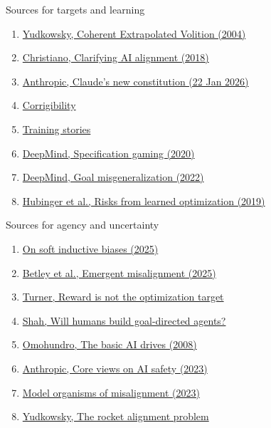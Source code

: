 \documentclass[aspectratio=169,11pt]{beamer}
\begin{document}
\begin{frame}[t,label=refstarget]{Sources for targets and learning}
\footnotesize\begin{enumerate}\setlength{\itemsep}{2mm}
\item \href{https://intelligence.org/files/CEV.pdf}{Yudkowsky, Coherent Extrapolated Volition (2004)}
\item \href{https://ai-alignment.com/clarifying-ai-alignment-cec47cd69dd6}{Christiano, Clarifying AI alignment (2018)}
\item \href{https://www.anthropic.com/news/claude-new-constitution}{Anthropic, Claude's new constitution (22 Jan 2026)}
\item \href{https://www.lesswrong.com/w/corrigibility-1}{Corrigibility}
\item \href{https://www.alignmentforum.org/posts/FDJnZt8Ks2djouQTZ/how-do-we-become-confident-in-the-safety-of-a-machine}{Training stories}
\item \href{https://deepmind.google/blog/specification-gaming-the-flip-side-of-ai-ingenuity/}{DeepMind, Specification gaming (2020)}
\item \href{https://deepmind.google/blog/how-undesired-goals-can-arise-with-correct-rewards/}{DeepMind, Goal misgeneralization (2022)}
\item \href{https://arxiv.org/abs/1906.01820}{Hubinger et al., Risks from learned optimization (2019)}
\end{enumerate}
\end{frame}

\begin{frame}[t,label=refsagency]{Sources for agency and uncertainty}
\footnotesize\begin{enumerate}\setlength{\itemsep}{2mm}
\item \href{https://arxiv.org/abs/2503.02113}{On soft inductive biases (2025)}
\item \href{https://arxiv.org/abs/2502.17424}{Betley et al., Emergent misalignment (2025)}
\item \href{https://www.alignmentforum.org/posts/pdaGN6pQyQarFHXF4}{Turner, Reward is not the optimization target}
\item \href{https://www.alignmentforum.org/posts/9zpT9dikrrebdq3Jf/will-humans-build-goal-directed-agents}{Shah, Will humans build goal-directed agents?}
\item \href{https://selfawaresystems.com/wp-content/uploads/2008/01/ai_drives_final.pdf}{Omohundro, The basic AI drives (2008)}
\item \href{https://www.anthropic.com/news/core-views-on-ai-safety}{Anthropic, Core views on AI safety (2023)}
\item \href{https://www.lesswrong.com/posts/ChDH335ckdvpxXaXX/model-organisms-of-misalignment-the-case-for-a-new-pillar-of-1}{Model organisms of misalignment (2023)}
\item \href{https://www.alignmentforum.org/posts/Gg9a4y8reWKtLe3Tn/the-rocket-alignment-problem}{Yudkowsky, The rocket alignment problem}
\end{enumerate}
\end{frame}
\end{document}
